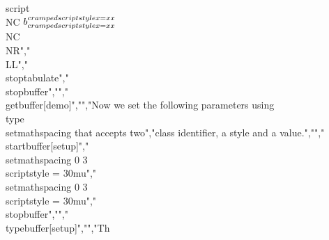 script \\NC $b_{\\crampedscriptstyle x=xx}^{\\crampedscriptstyle x=xx}$ \\NC \\NR","\\LL","\\stoptabulate","\\stopbuffer","","\\getbuffer[demo]","","Now we set the following parameters using \\type {\\setmathspacing} that accepts two","class identifier, a style and a value.","","\\startbuffer[setup]","\\setmathspacing 0 3 \\scriptstyle = 30mu","\\setmathspacing 0 3 \\scriptstyle = 30mu","\\stopbuffer","","\\typebuffer[setup]","","Th